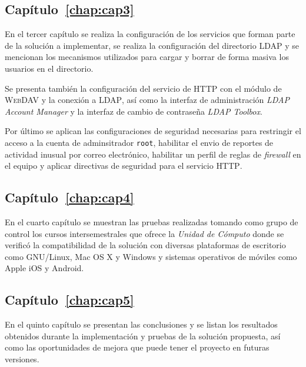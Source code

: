     \subsection*{Cap\'{i}tulo~\ref{chap:cap3}}

En el tercer cap\'{i}tulo se realiza la configuraci\'{o}n de los servicios que forman parte de la soluci\'{o}n a implementar, se realiza la configuraci\'{o}n del directorio \textsc{LDAP} y se mencionan los mecanismos utilizados para cargar y borrar de forma masiva los usuarios en el directorio.

Se presenta tambi\'{e}n la configuraci\'{o}n del servicio de \textsc{HTTP} con el m\'{o}dulo de \textsc{WebDAV} y la conexi\'{o}n a \textsc{LDAP}, as\'{i} como la interfaz de administraci\'{o}n \textit{LDAP Account Manager} y la interfaz de cambio de contrase\~{n}a \textit{LDAP Toolbox}.

Por \'{u}ltimo se aplican las configuraciones de seguridad necesarias para restringir el acceso a la cuenta de adminsitrador \texttt{root}, habilitar el envio de reportes de actividad inusual por correo electr\'{o}nico, habilitar un perfil de reglas de \textit{firewall} en el equipo y aplicar directivas de seguridad para el servicio \textsc{HTTP}.

    \subsection*{Cap\'{i}tulo~\ref{chap:cap4}}

En el cuarto cap\'{i}tulo se muestran las pruebas realizadas tomando como grupo de control los cursos intersemestrales que ofrece la \textsl{Unidad de C\'{o}mputo} donde se verific\'{o} la compatibilidad de la soluci\'{o}n con diversas plataformas de escritorio como GNU/Linux, Mac OS X y Windows y sistemas operativos de m\'{o}viles como Apple iOS y Android.

    \subsection*{Cap\'{i}tulo~\ref{chap:cap5}}

En el quinto cap\'{i}tulo se presentan las conclusiones y se listan los resultados obtenidos durante la implementaci\'{o}n y pruebas de la soluci\'{o}n propuesta, as\'{i} como las oportunidades de mejora que puede tener el proyecto en futuras versiones.

